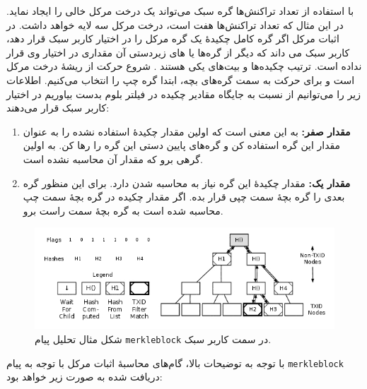 با استفاده از تعداد تراکنش‌ها گره سبک می‌تواند یک درخت مرکل خالی را ایجاد نماید. در این مثال که تعداد تراکنش‌ها هفت است، درخت مرکل سه لایه خواهد داشت. در اثبات مرکل اگر گره کامل چکیدهٔ یک گره مرکل را در اختیار کاربر سبک قرار دهد، کاربر سبک می داند که دیگر از گره‌ها یا های زیردستی آن مقداری در اختیار وی قرار نداده است. ترتیب چکیده‌ها و بیت‌های  یکی هستند . شروع حرکت از ریشهٔ درخت مرکل است و برای حرکت به سمت گره‌های بچه، ابتدا گره چپ را انتخاب می‌کنیم. اطلاعات زیر را می‌توانیم از  نسبت به جایگاه مقادیر چکیده در فیلتر بلوم بدست بیاوریم در اختیار کاربر سبک قرار می‌دهند:
\begin{enumerate}
	\item{%
	\textbf{مقدار صفر:}
	به این معنی است که اولین مقدار چکیدهٔ استفاده نشده را به عنوان مقدار این گره استفاده کن و گره‌های پایین دستی این گره را رها کن. به اولین گرهی برو که مقدار آن محاسبه نشده است.
}
	\item{%
	\textbf{مقدار یک:}
	مقدار چکیدهٔ این گره نیاز به محاسبه شدن دارد. برای این منظور گره بعدی را گره بچهٔ سمت چپی قرار بده. اگر مقدار چکیده در گره بچهٔ سمت چپ محاسبه شده است به گره بچهٔ سمت راست برو.
}
\end{enumerate}

\begin{figure}
	\centering
	\includegraphics[width=\linewidth]{image/merkleblock-parsing}
	\caption{شکل مثال تحلیل پیام \texttt{merkleblock} در سمت کاربر سبک.\cite{P2P_ref}}
	\label{fig:merkleblock-parsing}
\end{figure}

با توجه به توضیحات بالا، گام‌های محاسبهٔ اثبات مرکل با توجه به پیام \texttt{merkleblock} دریافت شده به صورت زیر خواهد بود:

